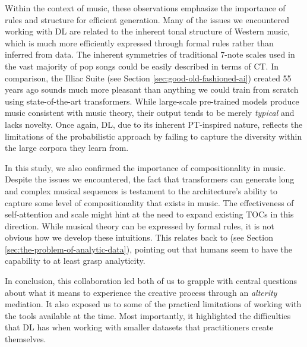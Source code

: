 Within the context of music, these observations emphasize the importance of rules and structure for efficient generation. Many of the issues we encountered working with DL are related to the inherent tonal structure of Western music, which is much more efficiently expressed through formal rules rather than inferred from data. The inherent symmetries of traditional 7-note scales used in the vast majority of pop songs could be easily described in terms of CT. In comparison, the Illiac Suite (see Section \ref{sec:good-old-fashioned-ai}) created 55 years ago sounds much more pleasant than anything we could train from scratch using state-of-the-art transformers. While large-scale pre-trained models produce music consistent with music theory, their output tends to be merely \emph{typical} and lacks novelty. Once again, DL, due to its inherent PT-inspired nature, reflects the limitations of the probabilistic approach by failing to capture the diversity within the large corpora they learn from.

In this study, we also confirmed the importance of compositionality in music. Despite the issues we encountered, the fact that transformers can generate long and complex musical sequences is testament to the architecture's ability to capture some level of compositionality that exists in music. The effectiveness of self-attention and scale might hint at the need to expand existing TOCs in this direction. While musical theory can be expressed by formal rules, it is not obvious how we develop these intuitions. This relates back to \citep{Rey1993} (see Section \ref{sec:the-problem-of-analytic-data}), pointing out that humans seem to have the capability to at least grasp analyticity.

In conclusion, this collaboration led both of us to grapple with central questions about what it means to experience the creative process through an \emph{alterity} mediation. It also exposed us to some of the practical limitations of working with the tools available at the time. Most importantly, it highlighted the difficulties that DL has when working with smaller datasets that practitioners create themselves.